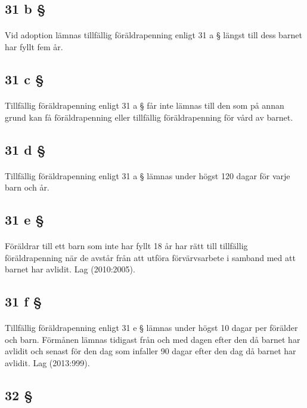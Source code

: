\documentclass[a4paper,notitlepage,openany,10pt]{book}
\begin{document}
\subsection*{31 b §}
\paragraph*{}
Vid adoption lämnas tillfällig föräldrapenning enligt 31 a § längst till dess barnet har fyllt fem år.
\subsection*{31 c §}
\paragraph*{}
Tillfällig föräldrapenning enligt 31 a § får inte lämnas till den som på annan grund kan få föräldrapenning eller tillfällig föräldrapenning för vård av barnet.
\subsection*{31 d §}
\paragraph*{}
Tillfällig föräldrapenning enligt 31 a § lämnas under högst 120 dagar för varje barn och år.
\subsection*{31 e §}
\paragraph*{}
Föräldrar till ett barn som inte har fyllt 18 år har rätt till tillfällig föräldrapenning när de avstår från att utföra förvärvsarbete i samband med att barnet har avlidit.
Lag (2010:2005).
\subsection*{31 f §}
\paragraph*{}
Tillfällig föräldrapenning enligt 31 e § lämnas under högst 10 dagar per förälder och barn. Förmånen lämnas tidigast från och med dagen efter den då barnet har avlidit och senast för den dag som infaller 90 dagar efter den dag då barnet har avlidit.
Lag (2013:999).
\subsection*{32 §}
\end{document}
